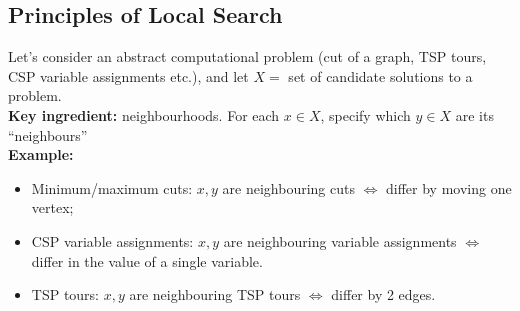 \documentclass{scrartcl}
\begin{document}
\subsection{Principles of Local Search}
\label{sec:19-3}
Let's consider an abstract computational problem (cut of a graph, TSP tours, CSP
variable assignments etc.), and let $X = $ set of candidate solutions to a
problem.\\  
{\bf Key ingredient: } neighbourhoods. For each $x \in X$, specify which $y \in
X$ are its ``neighbours''\\
{\bf Example: }
\begin{itemize}
\item Minimum/maximum cuts: $x, y$ are neighbouring cuts $\Leftrightarrow$ differ by moving one vertex;
\item CSP variable assignments: $x, y$ are neighbouring variable assignments
  $\Leftrightarrow$ differ in the value of a single variable.
\item TSP tours: $x, y$ are neighbouring TSP tours $\Leftrightarrow$ differ by 2
  edges. 
\end{itemize}
\end{document}
